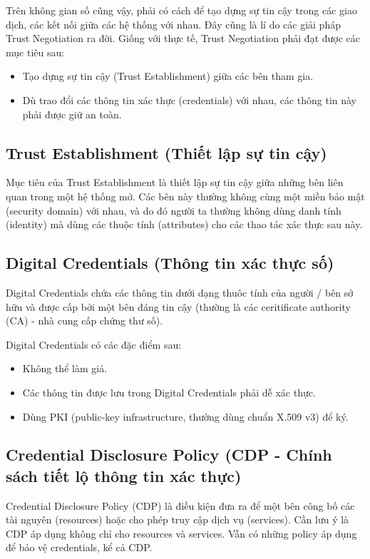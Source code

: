 \documentclass[12pt]{article}
\begin{document}
Trên không gian số cũng vậy, phải có cách để tạo dựng sự tin cậy trong các giao dịch, các kết nối giữa các hệ thống với nhau. Đây cũng là lí do các giải pháp Trust Negotiation ra đời. Giống với thực tế, Trust Negotiation phải đạt được các mục tiêu sau:
\begin{itemize}
\item Tạo dựng sự tin cậy (Trust Establishment) giữa các bên tham gia.
\item Dù trao đổi các thông tin xác thực (credentials) với nhau, các thông tin này phải được giữ an toàn. 
\end{itemize}

\subsection{Trust Establishment (Thiết lập sự tin cậy)}
Mục tiêu của Trust Establishment là thiết lập sự tin cậy giữa những bên liên quan trong một hệ thống mở. Các bên này thường không cùng một miền bảo mật (security domain) với nhau, và do đó người ta thường không dùng danh tính (identity) mà dùng các thuộc tính (attributes) cho các thao tác xác thực sau này.

\subsection{Digital Credentials (Thông tin xác thực số)}
Digital Credentials chứa các thông tin dưới dạng thuôc tính của người / bên sở hữu và được cấp bởi một bên đáng tin cậy (thường là các ceritificate authority (CA) - nhà cung cấp chứng thư số).

Digital Credentials có các đặc điểm sau:
\begin{itemize}
\item Không thể làm giả.
\item Các thông tin được lưu trong Digital Credentials phải dễ xác thực.
\item Dùng PKI (public-key infrastructure, thường dùng chuẩn X.509 v3) để ký.
\end{itemize}

\subsection{Credential Disclosure Policy (CDP - Chính sách tiết lộ thông tin xác thực)}
Credential Disclosure Policy (CDP) là điều kiện đưa ra để một bên công bố các tài nguyên (resources) hoặc cho phép truy cập dịch vụ (services). Cần lưu ý là CDP áp dụng không chỉ cho resources và services. Vẫn có những policy áp dụng để bảo vệ credentials, kể cả CDP.
\end{document}
